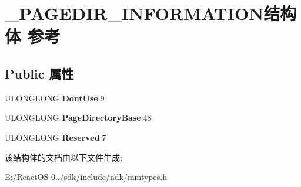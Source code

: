 \hypertarget{struct___p_a_g_e_d_i_r___i_n_f_o_r_m_a_t_i_o_n}{}\section{\+\_\+\+P\+A\+G\+E\+D\+I\+R\+\_\+\+I\+N\+F\+O\+R\+M\+A\+T\+I\+O\+N结构体 参考}
\label{struct___p_a_g_e_d_i_r___i_n_f_o_r_m_a_t_i_o_n}
\subsection*{Public 属性}
\begin{DoxyCompactItemize}
\item 
\mbox{\label{struct___p_a_g_e_d_i_r___i_n_f_o_r_m_a_t_i_o_n_ab4e1a52623ca4e25246c1704cd6b0eba}} 
U\+L\+O\+N\+G\+L\+O\+NG {\bfseries Dont\+Use}\+:9
\item 
\mbox{\label{struct___p_a_g_e_d_i_r___i_n_f_o_r_m_a_t_i_o_n_a479a1f07fa26bf1fccff721c9fd3bce1}} 
U\+L\+O\+N\+G\+L\+O\+NG {\bfseries Page\+Directory\+Base}\+:48
\item 
\mbox{\label{struct___p_a_g_e_d_i_r___i_n_f_o_r_m_a_t_i_o_n_aaa784e5ea1fae76033d68075023ad1ee}} 
U\+L\+O\+N\+G\+L\+O\+NG {\bfseries Reserved}\+:7
\end{DoxyCompactItemize}


该结构体的文档由以下文件生成\+:\begin{DoxyCompactItemize}
\item 
E\+:/\+React\+O\+S-\/0../sdk/include/ndk/mmtypes.\+h\end{DoxyCompactItemize}
